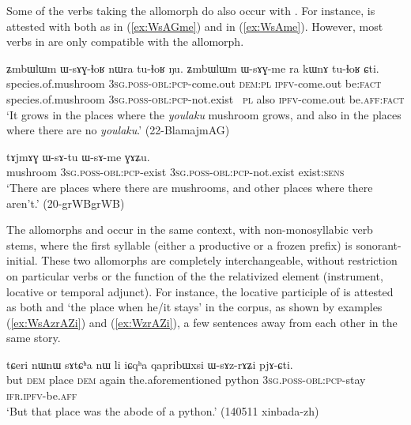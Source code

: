 Some of the verbs taking the  allomorph do also occur with . For instance,  is attested with both  as in (\ref{ex:WsAGme}) and  in (\ref{ex:WsAme}). However, most verbs in  are only compatible with the  allomorph.
\largerpage
\begin{exe}
\ex \label{ex:WsAGme}
\gll ʑmbɯlɯm ɯ-sɤɣ-ɬoʁ nɯra tu-ɬoʁ ŋu. ʑmbɯlɯm ɯ-sɤɣ-me ra kɯnɤ tu-ɬoʁ ɕti. \\
species.of.mushroom \textsc{3sg}.\textsc{poss}-\textsc{obl}:\textsc{pcp}-come.out \textsc{dem}:\textsc{pl} \textsc{ipfv}-come.out be:\textsc{fact} species.of.mushroom \textsc{3sg}.\textsc{poss}-\textsc{obl}:\textsc{pcp}-not.exist \ \textsc{pl} also \textsc{ipfv}-come.out be.\textsc{aff}:\textsc{fact} \\
\glt `It grows in the places where the \textit{youlaku} mushroom grows, and also in the places where there are no \textit{youlaku}.'  (22-BlamajmAG)
\end{exe}

 \begin{exe}
\ex \label{ex:WsAme}
\gll tɤjmɤɣ ɯ-sɤ-tu ɯ-sɤ-me ɣɤʑu. \\
mushroom \textsc{3sg}.\textsc{poss}-\textsc{obl}:\textsc{pcp}-exist  \textsc{3sg}.\textsc{poss}-\textsc{obl}:\textsc{pcp}-not.exist  exist:\textsc{sens} \\
\glt `There are places where there are mushrooms, and other places where there aren't.' (20-grWBgrWB) 
\end{exe}

The allomorphs  and  occur in the same context, with non-monosyllabic verb stems, where the first syllable (either a productive or a frozen prefix) is sonorant-initial. These two allomorphs are completely interchangeable, without restriction on particular verbs or the function of the the relativized element (instrument, locative or temporal adjunct). For instance, the locative participle of  is attested as both  and  `the place when he/it stays' in the corpus, as shown by examples (\ref{ex:WsAzrAZi}) and (\ref{ex:WzrAZi}), a few sentences away from each other in the same story.

\begin{exe}
\ex \label{ex:WsAzrAZi}
\gll  tɕeri nɯnɯ sɤtɕʰa nɯ li iɕqʰa qapribɯxsi ɯ-sɤz-rɤʑi pjɤ-ɕti. \\
but \textsc{dem} place \textsc{dem} again the.aforementioned python \textsc{3sg}.\textsc{poss}-\textsc{obl}:\textsc{pcp}-stay \textsc{ifr}.\textsc{ipfv}-be.\textsc{aff} \\
\glt `But that place was the abode of a python.' (140511 xinbada-zh)
\end{exe}


